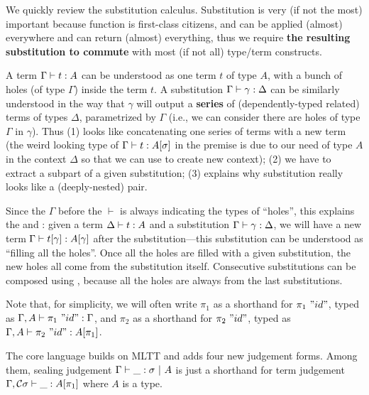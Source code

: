 We quickly review the substitution calculus.
Substitution is very (if not the most) important because function is
first-class citizens, and can be applied (almost) everywhere and can return
(almost) everything, thus we require \textbf{the resulting substitution to
commute} with most (if not all) type/term constructs. 

A term ${ {\Gamma} \vdash {t} : {A} }$ can be understood as one term $t$ of
type $A$, with a bunch of holes (of type $\Gamma$) inside the term $t$.
A substitution ${ {\Gamma} \vdash {\gamma} : {\Delta} }$ can be similarly
understood in the way that $\gamma$ will output a \textbf{series} of
(dependently-typed related) terms of types $\Delta$, parametrized by
$\Gamma$ (i.e., we can consider there are holes of type $\Gamma$ in $\gamma$).
Thus (1)  looks like concatenating one
series of terms with a new term (the weird looking type of
${ {\Gamma} \vdash {t} : {A[\sigma]} }$ in the premise is due to our need of type $A$ in
the context $\Delta$ so that we can use  to
create new context); (2) we have  to extract a
subpart of a given substitution; (3)  explains why
substitution really looks like a (deeply-nested) pair. 

Since the $\Gamma$ before the $\vdash$ is always indicating the types of
``holes'', this explains the  and : given a term ${ {\Delta} \vdash {t} : {A} }$ and a substitution
${ {\Gamma} \vdash {\gamma} : {\Delta} }$, we will have a new term
${ {\Gamma} \vdash {t[\gamma]} : {A[\gamma]} }$ after the substitution---this
substitution can be understood as ``filling all the holes''. Once all
the holes are filled with a given substitution, the new holes all come
from the substitution itself.
Consecutive substitutions can be composed using , because
all the holes are always from the last substitutions.

Note that, for simplicity, we will often write $\pi_1$ as a
shorthand for ${\pi_1~"id"}$, typed as
${ {\Gamma,A} \vdash {\pi_1~"id"} : {\Gamma} }$, and $\pi_2$ as a shorthand
for $\pi_2~"id"$, typed as ${ {\Gamma, A} \vdash {\pi_2~"id"} : {A[\pi_1]} }$.



The core language builds on MLTT and adds four new judgement forms.
Among them, sealing judgement ${ {\Gamma} \vdash {\_} : {\sigma} \ |\ {A} }$ is just a
shorthand for term judgement
${ {\Gamma , {\mathcal{C}} \sigma} \vdash {\_} : {A[\pi_1]} }$ where $A$ is a type.



